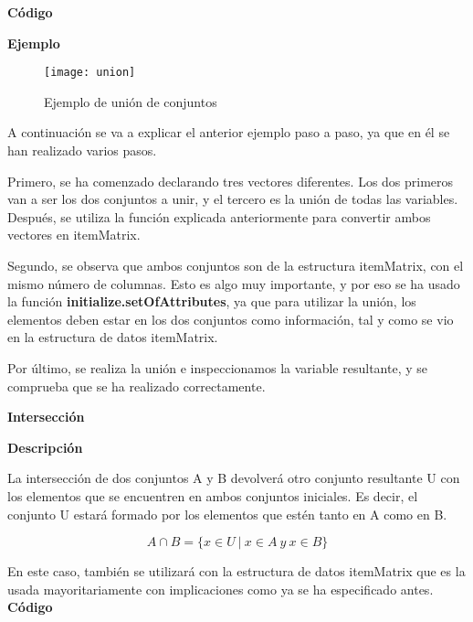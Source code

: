     \textbf{C\'odigo}

    
    \clearpage

    \textbf{Ejemplo}

    \begin{figure}[H]
        \centering
        \texttt{[image: union]}
        \caption{Ejemplo de uni\'on de conjuntos}
        \label{fig:union}
    \end{figure}

    A continuaci\'on se va a explicar el anterior ejemplo paso a paso, ya que en \'el se han realizado varios pasos.

    Primero, se ha comenzado declarando tres vectores diferentes. Los dos primeros van a ser los dos conjuntos a unir, y el 
    tercero es la uni\'on de todas las variables. Despu\'es, se utiliza la funci\'on explicada anteriormente para convertir ambos 
    vectores en itemMatrix.

    Segundo, se observa que ambos conjuntos son de la estructura itemMatrix, con el mismo n\'umero de columnas. Esto es algo muy 
    importante, y por eso se ha usado la funci\'on \textbf{initialize.setOfAttributes}, ya que para utilizar la uni\'on, los elementos deben 
    estar en los dos conjuntos como informaci\'on, tal y como se vio en la estructura de datos itemMatrix.

    Por \'ultimo, se realiza la uni\'on e inspeccionamos la variable resultante, y se comprueba que se ha realizado correctamente.
    \\

    \bigskip

\textbf{ \large Intersecci\'on}

\smallskip

    \textbf{Descripci\'on}
    
    La intersecci\'on de dos conjuntos A y B devolver\'a otro conjunto resultante U con los elementos 
    que se encuentren en ambos conjuntos iniciales. Es decir, el conjunto U estar\'a formado por los elementos 
    que est\'en tanto en A como en B.

    \[
        A \cap B = \{x\in U ~ | ~ x\in A ~ y ~ x\in B \}
    \]

    En este caso, tambi\'en se utilizar\'a con la estructura de datos itemMatrix que es la usada mayoritariamente con implicaciones 
    como ya se ha especificado antes.
    \\


    \textbf{C\'odigo}

